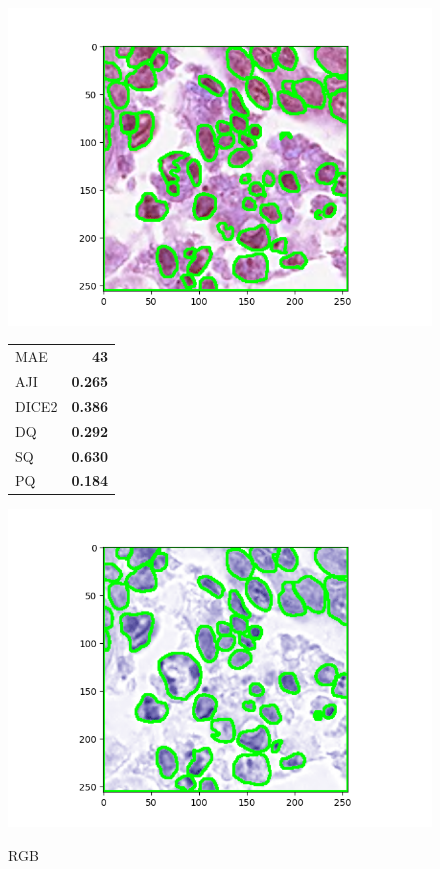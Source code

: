 \documentclass[target=bach,aauheader=,style=]{thud}
\begin{document}
\begin{figure}[ht]
\centering

\begin{minipage}{0.48\textwidth}\centering
  \includegraphics[width=\linewidth]{imgs/qualitative/worst/RGB/contour_img.png}\\[-1ex]
  \footnotesize
  \begin{tabular}{@{}lr@{}}
   MAE & \textbf{43}\\ AJI & \textbf{0.265}\\ DICE2 & \textbf{0.386}\\
   DQ & \textbf{0.292}\\ SQ & \textbf{0.630}\\ PQ & \textbf{0.184}
  \end{tabular}
  \caption*{RGB}
\end{minipage}\hfill
\begin{minipage}{0.48\textwidth}\centering
  \includegraphics[width=\linewidth]{imgs/qualitative/worst/HE/contour_img.png}\\[-1ex]

\end{minipage}
\end{figure}
\end{document}
